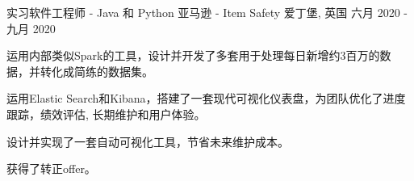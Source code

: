 \begin{cventries}
  \cventry
    {实习软件工程师 - Java 和 Python} %
    {亚马逊 - Item Safety} %
    {爱丁堡, 英国} %
    {六月 2020 - 九月 2020} %
    {
      \begin{cvitems} %
        \item {运用内部类似Spark的工具，设计并开发了多套用于处理每日新增约3百万的数据，并转化成简练的数据集。}
        \item {运用Elastic Search和Kibana，搭建了一套现代可视化仪表盘，为团队优化了进度跟踪，绩效评估, 长期维护和用户体验。}
        \item {设计并实现了一套自动可视化工具，节省未来维护成本。}
        \item {获得了转正offer。}
      \end{cvitems}
    }

  
\end{cventries}

